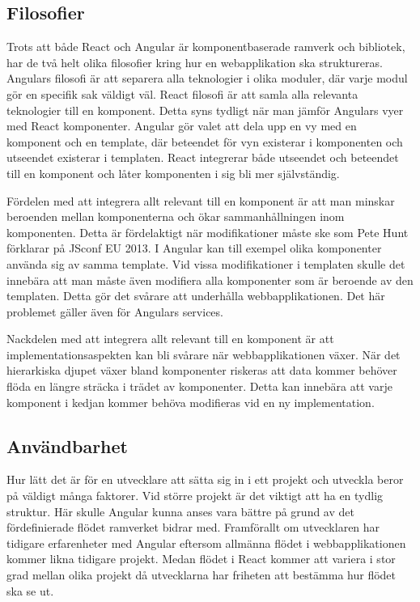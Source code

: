 \subsection{Filosofier}
Trots att både React och Angular är komponentbaserade ramverk och bibliotek, har de två helt olika filosofier kring hur en webapplikation ska struktureras. Angulars filosofi är att separera alla teknologier i olika moduler, där varje modul gör en specifik sak väldigt väl. React filosofi är att samla alla relevanta teknologier till en komponent. Detta syns tydligt när man jämför Angulars vyer med React komponenter. Angular gör valet att dela upp en vy med en komponent och en template, där beteendet för vyn existerar i komponenten och utseendet existerar i templaten. React integrerar både utseendet och beteendet till en komponent och låter komponenten i sig bli mer självständig. 

Fördelen med att integrera allt relevant till en komponent är att man minskar beroenden mellan komponenterna och ökar sammanhållningen inom komponenten. Detta är fördelaktigt när modifikationer måste ske som Pete Hunt förklarar på JSconf EU 2013.\cite{JSConf} I Angular kan till exempel olika komponenter använda sig av samma template. Vid vissa modifikationer i templaten skulle det innebära att man måste även modifiera alla komponenter som är beroende av den templaten. Detta gör det svårare att underhålla webbapplikationen. Det här problemet gäller även för Angulars services.

Nackdelen med att integrera allt relevant till en komponent är att implementationsaspekten kan bli svårare när webbapplikationen växer. När det hierarkiska djupet växer bland komponenter riskeras att data kommer behöver flöda en längre sträcka i trädet av komponenter. Detta kan innebära att varje komponent i kedjan kommer behöva modifieras vid en ny implementation.




\subsection{Användbarhet}
Hur lätt det är för en utvecklare att sätta sig in i ett projekt och utveckla beror på väldigt många faktorer. Vid större projekt är det viktigt att ha en tydlig struktur. Här skulle Angular kunna anses vara bättre på grund av det fördefinierade flödet ramverket bidrar med. Framförallt om utvecklaren har tidigare erfarenheter med Angular eftersom allmänna flödet i webbapplikationen kommer likna tidigare projekt. Medan flödet i React kommer att variera i stor grad mellan olika projekt då utvecklarna har friheten att bestämma hur flödet ska se ut. 

